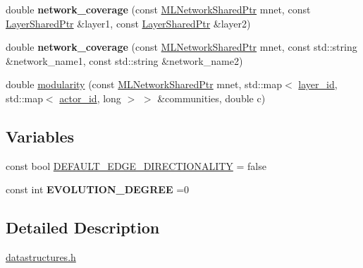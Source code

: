 \begin{DoxyCompactItemize}
\item 
\hypertarget{namespacemlnet_aa57d968a779ee583c07d5ab74c3c5831}{double {\bfseries network\+\_\+coverage} (const \hyperlink{namespacemlnet_aa6d3fa87865bcde4d1283abb1942cbbb}{M\+L\+Network\+Shared\+Ptr} mnet, const \hyperlink{namespacemlnet_a10c007fb811c55339dd5b9d32bb0505d}{Layer\+Shared\+Ptr} \&layer1, const \hyperlink{namespacemlnet_a10c007fb811c55339dd5b9d32bb0505d}{Layer\+Shared\+Ptr} \&layer2)}\label{namespacemlnet_aa57d968a779ee583c07d5ab74c3c5831}

\item 
\hypertarget{namespacemlnet_a03f1a48667bf3a754aec66cb1849d26d}{double {\bfseries network\+\_\+coverage} (const \hyperlink{namespacemlnet_aa6d3fa87865bcde4d1283abb1942cbbb}{M\+L\+Network\+Shared\+Ptr} mnet, const std\+::string \&network\+\_\+name1, const std\+::string \&network\+\_\+name2)}\label{namespacemlnet_a03f1a48667bf3a754aec66cb1849d26d}

\item 
double \hyperlink{namespacemlnet_aac120ae00185742397a27608597e09c7}{modularity} (const \hyperlink{namespacemlnet_aa6d3fa87865bcde4d1283abb1942cbbb}{M\+L\+Network\+Shared\+Ptr} mnet, std\+::map$<$ \hyperlink{namespacemlnet_a84ad9c6056f0eb7d129995351f9b13fb}{layer\+\_\+id}, std\+::map$<$ \hyperlink{namespacemlnet_a1d557bff46b627f1d7f6ff613302bba5}{actor\+\_\+id}, long $>$ $>$ \&communities, double c)
\end{DoxyCompactItemize}
\subsection*{Variables}
\begin{DoxyCompactItemize}
\item 
const bool \hyperlink{namespacemlnet_aac7f43aa0ec7157757c5a0e694e97706}{D\+E\+F\+A\+U\+L\+T\+\_\+\+E\+D\+G\+E\+\_\+\+D\+I\+R\+E\+C\+T\+I\+O\+N\+A\+L\+I\+T\+Y} = false
\item 
\hypertarget{namespacemlnet_a2ca45ff3813296ab392ec3c0ac1ede26}{const int {\bfseries E\+V\+O\+L\+U\+T\+I\+O\+N\+\_\+\+D\+E\+G\+R\+E\+E} =0}\label{namespacemlnet_a2ca45ff3813296ab392ec3c0ac1ede26}

\end{DoxyCompactItemize}


\subsection{Detailed Description}
\hyperlink{datastructures_8h_source}{datastructures.\+h}

